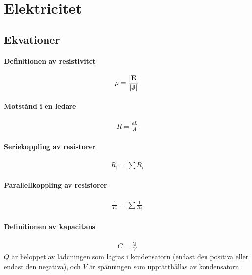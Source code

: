 \section{Elektricitet}

\subsection{Ekvationer}

\paragraph{Definitionen av resistivitet}
\begin{align*}
	\rho = \frac{\abs{\vect{E}}}{\abs{\vect{J}}}
\end{align*}

\paragraph{Motstånd i en ledare}
\begin{align*}
	R = \frac{\rho L}{A}
\end{align*}

\paragraph{Seriekoppling av resistorer}
\begin{align*}
	R_\text{t} = \sum R_i
\end{align*}

\deriv

\paragraph{Parallellkoppling av resistorer}
\begin{align*}
	\frac{1}{R_\text{t}} = \sum \frac{1}{R_i}
\end{align*}

\deriv

\paragraph{Definitionen av kapacitans}
\begin{align*}
	C = \frac{Q}{V}
\end{align*}
$Q$ är beloppet av laddningen som lagras i kondensatorn (endast den positiva eller endast den negativa), och $V$ är spänningen som upprätthållas av kondensatorn.

